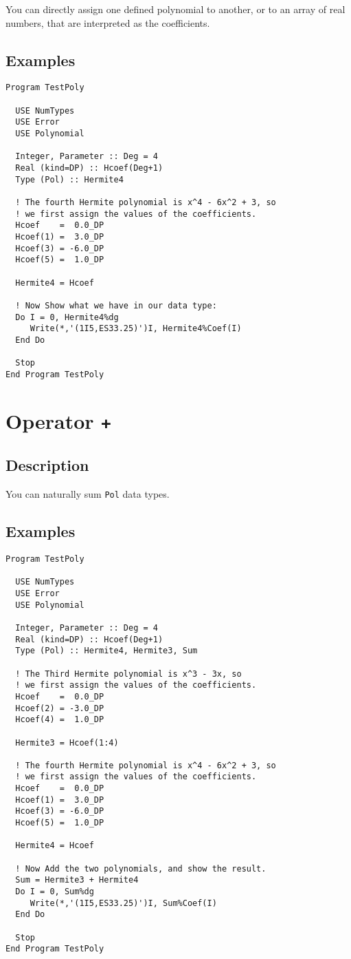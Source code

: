 You can directly assign one defined polynomial to another, or to an
array of real numbers, that are interpreted as the coefficients. 

\subsection{Examples}


\begin{verbatim}
Program TestPoly

  USE NumTypes
  USE Error
  USE Polynomial

  Integer, Parameter :: Deg = 4
  Real (kind=DP) :: Hcoef(Deg+1)
  Type (Pol) :: Hermite4

  ! The fourth Hermite polynomial is x^4 - 6x^2 + 3, so
  ! we first assign the values of the coefficients.
  Hcoef    =  0.0_DP
  Hcoef(1) =  3.0_DP
  Hcoef(3) = -6.0_DP
  Hcoef(5) =  1.0_DP

  Hermite4 = Hcoef

  ! Now Show what we have in our data type:
  Do I = 0, Hermite4%dg
     Write(*,'(1I5,ES33.25)')I, Hermite4%Coef(I)
  End Do

  Stop
End Program TestPoly
\end{verbatim}

\section{Operator \texttt{+}}

\subsection{Description}

You can naturally sum \texttt{Pol} data types.

\subsection{Examples}

\begin{verbatim}
Program TestPoly

  USE NumTypes
  USE Error
  USE Polynomial

  Integer, Parameter :: Deg = 4
  Real (kind=DP) :: Hcoef(Deg+1)
  Type (Pol) :: Hermite4, Hermite3, Sum

  ! The Third Hermite polynomial is x^3 - 3x, so
  ! we first assign the values of the coefficients.
  Hcoef    =  0.0_DP
  Hcoef(2) = -3.0_DP
  Hcoef(4) =  1.0_DP

  Hermite3 = Hcoef(1:4)

  ! The fourth Hermite polynomial is x^4 - 6x^2 + 3, so
  ! we first assign the values of the coefficients.
  Hcoef    =  0.0_DP
  Hcoef(1) =  3.0_DP
  Hcoef(3) = -6.0_DP
  Hcoef(5) =  1.0_DP

  Hermite4 = Hcoef

  ! Now Add the two polynomials, and show the result.
  Sum = Hermite3 + Hermite4
  Do I = 0, Sum%dg
     Write(*,'(1I5,ES33.25)')I, Sum%Coef(I)
  End Do

  Stop
End Program TestPoly
\end{verbatim}

